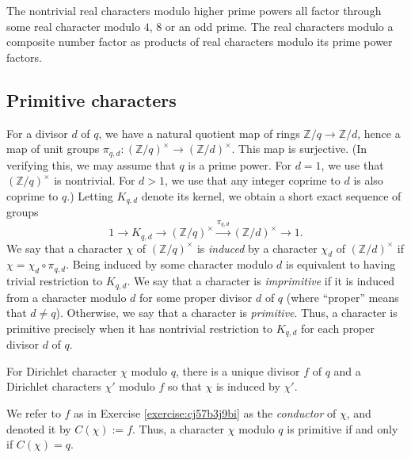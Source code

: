\documentclass[reqno]{amsart}  \numberwithin{theorem}{section} \numberwithin{equation}{section}
\begin{document}
\begin{remark}\label{remark:cj57ckerd1}
  The nontrivial real characters modulo higher prime powers all factor through some real character modulo $4$, $8$ or an odd prime.  The real characters modulo a composite number factor as products of real characters modulo its prime power factors.
\end{remark}

\subsection{Primitive characters}\label{sec:cj57ckeqfd}
For a divisor $d$ of $q$, we have a natural quotient map of rings $\mathbb{Z} / q \rightarrow \mathbb{Z} / d$, hence a map of unit groups $\pi_{q, d} :  (\mathbb{Z} / q)^\times \rightarrow (\mathbb{Z} / d)^\times $.  This map is surjective.  (In verifying this, we may assume that $q$ is a prime power.  For $d = 1$, we use that $(\mathbb{Z} / q)^\times $ is nontrivial. For $d > 1$, we use that any integer coprime to $d$ is also coprime to $q$.)  Letting $K_{q, d}$ denote its kernel, we obtain a short exact sequence of groups
\begin{equation}\label{eq:cj57cjzbqc}
1 \rightarrow K_{q, d} \rightarrow (\mathbb{Z} / q)^\times \xrightarrow{\pi_{q, d}} (\mathbb{Z} / d)^\times \rightarrow 1.
\end{equation}
We say that a character $\chi$ of $(\mathbb{Z} / q)^\times $ is \emph{induced} by a character $\chi_d$ of $(\mathbb{Z} / d )^\times $ if $\chi = \chi_d \circ \pi_{q, d}$.  Being induced by some character modulo $d$ is equivalent to having trivial restriction to $K_{q, d}$.  We say that a character is \emph{imprimitive} if it is induced from a character modulo $d$ for some proper divisor $d$ of $q$ (where ``proper'' means that $d \neq q$).  Otherwise, we say that a character is \emph{primitive}.  Thus, a character is primitive precisely when it has nontrivial restriction to $K_{q, d}$ for each proper divisor $d$ of $q$.

\begin{exercise}\label{exercise:cj57b3j9bi}
For Dirichlet character $\chi$ modulo $q$, there is a unique divisor $f$ of $q$ and a Dirichlet characters $\chi '$ modulo $f$ so that $\chi$ is induced by $\chi '$.
\end{exercise}
We refer to $f$ as in Exercise \ref{exercise:cj57b3j9bi} as the \emph{conductor} of $\chi$, and denoted it by $C(\chi) := f$.  Thus, a character $\chi$ modulo $q$ is primitive if and only if $C(\chi) = q$.
\end{document}

